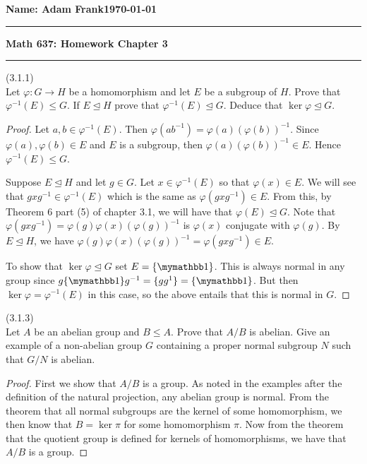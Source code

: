 \documentclass{exam}
\begin{document}
\noindent \textbf{Name: Adam Frank}\hfill \textbf{\today}

\vspace{.3cm}
\hrule
\begin{center}
{\bf \Large{Math 637: Homework Chapter 3}}
\end{center}
\hrule
\vspace{.3cm}


\begin{questions}
\question(3.1.1)\\
Let $\varphi: G\rightarrow H$ be a homomorphism and let $E$ be a subgroup of $H$.  Prove that $\varphi^{-1}(E)\leq G$.  If $E\trianglelefteq H$ prove that $\varphi^{-1}(E)\trianglelefteq G$.  Deduce that $\ker \varphi \trianglelefteq G$.

\begin{proof}
  Let $a,b\in\varphi^{-1}(E)$.  Then $\varphi(ab^{-1}) = \varphi(a)(\varphi(b))^{-1}$.  Since $\varphi(a),\varphi(b)\in E$ and $E$ is a subgroup, then $\varphi(a)(\varphi(b))^{-1}\in E$.  Hence $\varphi^{-1}(E)\leq G$.

  Suppose $E\trianglelefteq H$ and let $g\in G$.  Let $x\in \varphi^{-1}(E)$ so that $\varphi(x)\in E$. We will see that $gxg^{-1}\in\varphi^{-1}(E)$ which is the same as $\varphi(gxg^{-1})\in E$.  From this, by Theorem 6 part (5) of chapter 3.1, we will have that $\varphi(E)\trianglelefteq G$.  Note that $\varphi(gxg^{-1}) = \varphi(g)\varphi(x)(\varphi(g))^{-1}$ is $\varphi(x)$ conjugate with $\varphi(g)$.  By $E\trianglelefteq H$, we have $\varphi(g)\varphi(x)(\varphi(g))^{-1} = \varphi(gxg^{-1})\in E$.

  To show that $\ker \varphi \trianglelefteq G$ set $E=\{\mymathbb 1\}$.  This is always normal in any group since $g\{\mymathbb 1\}g^{-1} = \{gg^{1}\}=\{\mymathbb 1\}$.  But then $\ker\varphi = \varphi^{-1}(E)$ in this case, so the above entails that this is normal in $G$.
\end{proof}

\question(3.1.3)\\
Let $A$ be an abelian group and $B\leq A$.  Prove that $A/B$ is abelian.  Give an example of a non-abelian group $G$ containing a proper normal subgroup $N$ such that $G/N$ is abelian.

\begin{proof}
  First we show that $A/B$ is a group.  As noted in the examples after the definition of the natural projection, any abelian group is normal.  From the theorem that all normal subgroups are the kernel of some homomorphism, we then know that $B = \ker \pi$ for some homomorphism $\pi$.  Now from the theorem that the quotient group is defined for kernels of homomorphisms, we have that $A/B$ is a group.


\end{proof}
\end{questions}
\end{document}
